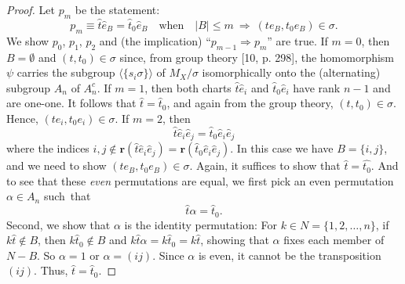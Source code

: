 \documentclass{surv-l}
\numberwithin{equation}{section}
\numberwithin{table}{section}
\numberwithin{figure}{section}
\theoremstyle{plain}
\theoremstyle{definition}
\begin{document}
\begin{proof} Let $p_{m}$ be the statement:
\[
p_{m} \equiv\widehat{t}\widehat{e}_{B}=\widehat{t}_{0}\widehat{e}_{B}\quad
\mathrm{when}\quad |B|\leq m\ \Rightarrow\ (te_{B}, t_{0}e_{B})\in\sigma.
\]
We show $p_{0}$, $p_{1}$, $p_{2}$ and (the implication)
``$p_{m-1}\Rightarrow p_{m}$'' are true. If $m= 0$, then
$B=\emptyset$ and $(t,t_{0})\in\sigma$ since, from group theory
[10, p. 298], the homomorphism $\psi$ carries the
subgroup $\langle\{s_{i}\sigma\}\rangle$ of $M_{X}/\sigma$
isomorphically onto the (alternating) subgroup $A_{n}$ of
$A_{n}^{c}$. If $m=1$, then both charts
$\widehat{t}\widehat{e}_{i}$ and $\widehat{t}_{0}\widehat{e}_{i}$
have rank $n-1$ and are one-one. It follows that
$\widehat{t}=\widehat{t}_{0}$, and again from the group theory,
$(t, t_{0})\in\sigma$. Hence, $(te_{i}, t_{0}e_{i})\in\sigma$. If
$m=2$, then
\[
\widehat{t}\widehat{e}_{i}\widehat{e}_{j}=\widehat{t}_{0}\widehat{e}_{i}\widehat{e}_{j}
\]
where the indices $i,j\not\in
\mathbf{r}(\widehat{t}\widehat{e}_{i}\widehat{e}_{j})=\mathbf{r}(\widehat{t}_{0}\widehat{e}_{i}\widehat{e}_{j})$.
In this case we have $B=\{i,j\}$, and we need to show $(te_{B},
t_{0}e_{B})\in\sigma$. Again, it suffices to show that
$\widehat{t}=\widehat{t_{0}}$. And to see that these \emph{even}
permutations are equal, we first pick an even permutation
$\alpha\in A_{n}$ such~that
\[
\widehat{t}\alpha=\widehat{t}_{0}.
\]
Second, we show that $\alpha$ is the identity permutation: For
$k\in N=\{1,2,\ldots, n\}$, if $k\widehat{t}\not\in B$, then
$k\widehat{t}_{0}\not\in B$ and
$k\widehat{t}\alpha=k\widehat{t}_{0}=k\widehat{t}$, showing that
$\alpha$ fixes each member of $N-B$. So $\alpha=1$ or
$\alpha=(ij)$. Since $\alpha$ is even, it cannot be the
transposition $(ij)$. Thus, $\widehat{t}=\widehat{t}_{0}$.


\end{proof}
\end{document}
